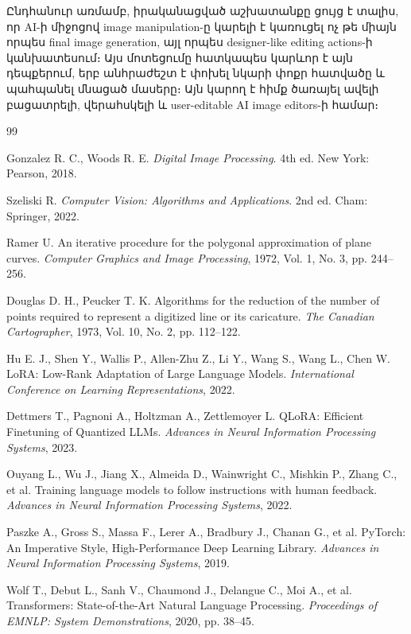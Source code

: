 \documentclass[12pt,a4paper]{report}
\newcommand{\Eng}[1]{\textenglish{#1}}
\begin{document}
Ընդհանուր առմամբ, իրականացված աշխատանքը ցույց է տալիս, որ \Eng{AI}-ի միջոցով image manipulation-ը կարելի է կառուցել ոչ թե միայն որպես final image generation, այլ որպես designer-like editing actions-ի կանխատեսում։ Այս մոտեցումը հատկապես կարևոր է այն դեպքերում, երբ անհրաժեշտ է փոխել նկարի փոքր հատվածը և պահպանել մնացած մասերը։ Այն կարող է հիմք ծառայել ավելի բացատրելի, վերահսկելի և user-editable AI image editors-ի համար։

\begin{thebibliography}{99}

Gonzalez R. C., Woods R. E. \textit{Digital Image Processing}. 4th ed. New York: Pearson, 2018.

Szeliski R. \textit{Computer Vision: Algorithms and Applications}. 2nd ed. Cham: Springer, 2022.

Ramer U. An iterative procedure for the polygonal approximation of plane curves. \textit{Computer Graphics and Image Processing}, 1972, Vol. 1, No. 3, pp. 244--256.

Douglas D. H., Peucker T. K. Algorithms for the reduction of the number of points required to represent a digitized line or its caricature. \textit{The Canadian Cartographer}, 1973, Vol. 10, No. 2, pp. 112--122.

Hu E. J., Shen Y., Wallis P., Allen-Zhu Z., Li Y., Wang S., Wang L., Chen W. LoRA: Low-Rank Adaptation of Large Language Models. \textit{International Conference on Learning Representations}, 2022.

Dettmers T., Pagnoni A., Holtzman A., Zettlemoyer L. QLoRA: Efficient Finetuning of Quantized LLMs. \textit{Advances in Neural Information Processing Systems}, 2023.

Ouyang L., Wu J., Jiang X., Almeida D., Wainwright C., Mishkin P., Zhang C., et al. Training language models to follow instructions with human feedback. \textit{Advances in Neural Information Processing Systems}, 2022.

Paszke A., Gross S., Massa F., Lerer A., Bradbury J., Chanan G., et al. PyTorch: An Imperative Style, High-Performance Deep Learning Library. \textit{Advances in Neural Information Processing Systems}, 2019.

Wolf T., Debut L., Sanh V., Chaumond J., Delangue C., Moi A., et al. Transformers: State-of-the-Art Natural Language Processing. \textit{Proceedings of EMNLP: System Demonstrations}, 2020, pp. 38--45.


\end{thebibliography}
\end{document}
